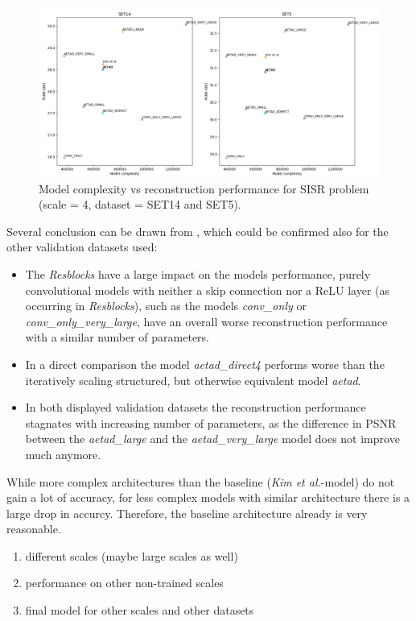 \begin{figure}[!htbp]
	\centering
	\includegraphics[width=14cm]{figures/psnr_complexty_sisr}
	\caption{Model complexity vs reconstruction performance for \ac{SISR}
	problem (scale = 4, dataset = SET14 and SET5).}
  \label{fig:psnr_complexty_sisr}
\end{figure}

Several conclusion can be drawn from , which
could be confirmed also for the other validation datasets used:

\begin{itemize}
\item The \textit{Resblocks} have a large impact on the models performance,
purely convolutional models with neither a skip connection nor a ReLU layer
(as occurring in \textit{Resblocks}), such as the models \textit{conv\_only} or
\textit{conv\_only\_very\_large}, have an overall worse reconstruction
performance with a similar number of parameters.
\item In a direct comparison the model \textit{aetad\_direct4} performs worse
than the iteratively scaling structured, but otherwise equivalent model
\textit{aetad}.
\item In both displayed validation datasets the reconstruction performance
stagnates with increasing number of parameters, as the difference in \ac{PSNR}
between the \textit{aetad\_large} and the \textit{aetad\_very\_large}
model does not improve much anymore.
\end{itemize}

While more complex architectures than the baseline (\textit{Kim et al.}-model)
do not gain a lot of accuracy, for less complex models with similar architecture
there is a large drop in accurcy. Therefore, the baseline architecture already
is very reasonable.

\begin{enumerate}
\item different scales (maybe large scales as well)
\item performance on other non-trained scales
\item final model for other scales and other datasets
\end{enumerate}

